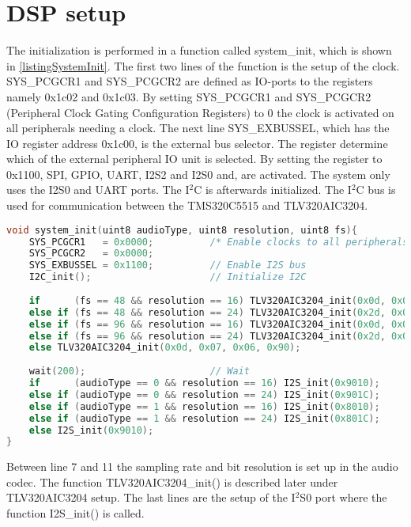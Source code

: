 \chapter{DSP setup}

The initialization is performed in a function called system\_init, which is shown in \autoref{listingSystemInit}. The first two lines of the function is the setup of the clock. SYS\_PCGCR1 and SYS\_PCGCR2 are defined as IO-ports to the registers namely 0x1c02 and 0x1c03. By setting SYS\_PCGCR1 and SYS\_PCGCR2 (Peripheral Clock Gating Configuration Registers) to 0 the clock is activated on all peripherals needing a clock. The next line SYS\_EXBUSSEL, which has the IO register address 0x1c00, is the external bus selector. The register determine which of the external peripheral IO unit is selected. By setting the register to 0x1100, SPI, GPIO, UART, I2S2 and I2S0 and, are activated. The system only uses the I2S0 and UART ports. The I$^2$C is afterwards initialized. The I$^2$C bus is used for communication between the TMS320C5515 and TLV320AIC3204.

\begin{lstlisting}[language=C, caption = {System initialization},label={listingSystemInit}]
void system_init(uint8 audioType, uint8 resolution, uint8 fs){
    SYS_PCGCR1 	 = 0x0000;     		/* Enable clocks to all peripherals */
    SYS_PCGCR2 	 = 0x0000;
	SYS_EXBUSSEL = 0x1100;         	// Enable I2S bus
	I2C_init();        				// Initialize I2C
	
	if 		(fs == 48 && resolution == 16) TLV320AIC3204_init(0x0d, 0x07, 0x06, 0x90);
	else if (fs == 48 && resolution == 24) TLV320AIC3204_init(0x2d, 0x07, 0x06, 0x90);	
	else if (fs == 96 && resolution == 16) TLV320AIC3204_init(0x0d, 0x0E, 0x0D, 0x20);	
	else if	(fs == 96 && resolution == 24) TLV320AIC3204_init(0x2d, 0x0E, 0x0D, 0x20);
	else TLV320AIC3204_init(0x0d, 0x07, 0x06, 0x90);	
	
	wait(200);        				// Wait	
	if 		(audioType == 0 && resolution == 16) I2S_init(0x9010);
	else if (audioType == 0 && resolution == 24) I2S_init(0x901C);	
	else if (audioType == 1 && resolution == 16) I2S_init(0x8010);	
	else if	(audioType == 1 && resolution == 24) I2S_init(0x801C);
	else I2S_init(0x9010);
}
\end{lstlisting}
Between line 7 and 11 the sampling rate and bit resolution is set up in the audio codec. The function TLV320AIC3204\_init() is described later under TLV320AIC3204 setup. The last lines are the setup of the I$^2$S0 port where the function I2S\_init() is called.

